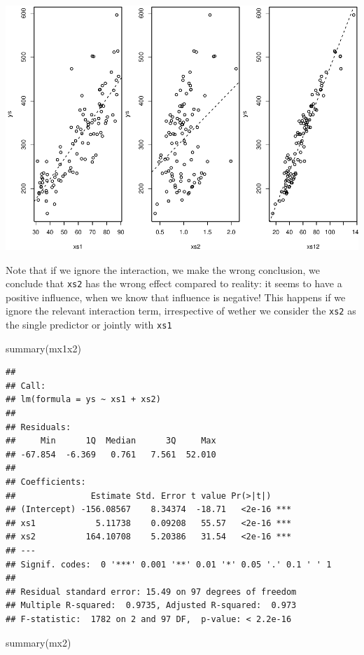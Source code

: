 \documentclass[
]{book}
\newenvironment{Shaded}{\begin{snugshade}}{\end{snugshade}}
\newcommand{\FunctionTok}[1]{\textcolor[rgb]{0.00,0.00,0.00}{#1}}
\newcommand{\NormalTok}[1]{#1}
\begin{document}
\includegraphics{ECOMODbook_files/figure-latex/a12.5-1.pdf}

Note that if we ignore the interaction, we make the wrong conclusion, we conclude that \texttt{xs2} has the wrong effect compared to reality: it seems to have a positive influence, when we know that influence is negative! This happens if we ignore the relevant interaction term, irrespective of wether we consider the \texttt{xs2} as the single predictor or jointly with \texttt{xs1}

\begin{Shaded}
\begin{Highlighting}[]
\FunctionTok{summary}\NormalTok{(mx1x2)}
\end{Highlighting}
\end{Shaded}

\begin{verbatim}
## 
## Call:
## lm(formula = ys ~ xs1 + xs2)
## 
## Residuals:
##     Min      1Q  Median      3Q     Max 
## -67.854  -6.369   0.761   7.561  52.010 
## 
## Coefficients:
##               Estimate Std. Error t value Pr(>|t|)    
## (Intercept) -156.08567    8.34374  -18.71   <2e-16 ***
## xs1            5.11738    0.09208   55.57   <2e-16 ***
## xs2          164.10708    5.20386   31.54   <2e-16 ***
## ---
## Signif. codes:  0 '***' 0.001 '**' 0.01 '*' 0.05 '.' 0.1 ' ' 1
## 
## Residual standard error: 15.49 on 97 degrees of freedom
## Multiple R-squared:  0.9735, Adjusted R-squared:  0.973 
## F-statistic:  1782 on 2 and 97 DF,  p-value: < 2.2e-16
\end{verbatim}

\begin{Shaded}
\begin{Highlighting}[]
\FunctionTok{summary}\NormalTok{(mx2)}
\end{Highlighting}
\end{Shaded}
\end{document}
